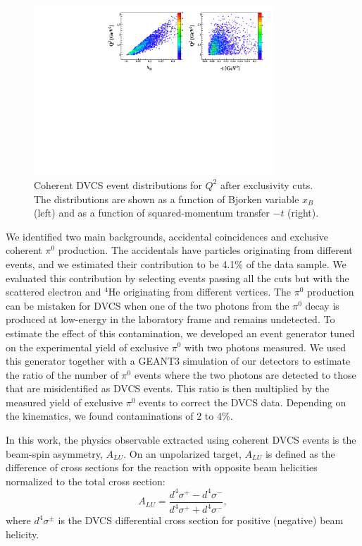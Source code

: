 \documentclass[twocolumn,nofootinbib,showpacs,prl,superscriptaddress,secnumarabic,amssymb,nobibnotes,aps,floatfix]{revtex4}
\begin{document}
\begin{figure}[tb]
\hspace{-0.45cm}
\includegraphics[width=9cm]{figs/F_Q2_xB_t_Coh.pdf}
\caption{Coherent DVCS event distributions for $Q^2$ after exclusivity cuts. 
The distributions are shown as a function of Bjorken variable $x_B$ (left) 
and as a function of squared-momentum transfer $-t$ (right).}
\label{fig:kin-coverage}
\end{figure}

We identified two main backgrounds, accidental coincidences and exclusive coherent
$\pi^0$ production. The accidentals have particles originating from different events,
and we estimated their contribution to be 4.1\% of the data sample. We evaluated this 
contribution by selecting events passing all the cuts but with the scattered electron and 
$^4$He originating from different vertices. The $\pi^0$ production can
be mistaken for DVCS when one of the two photons from the $\pi^0$ 
decay is produced at low-energy in the laboratory frame and remains undetected.  
To estimate the effect of this contamination, we developed an event generator 
tuned on the experimental yield of exclusive $\pi^0$ with two photons measured. 
We used this generator together with a GEANT3 simulation of our 
detectors to estimate the ratio of the number of $\pi^0$ events where the 
two photons are detected to those that are misidentified as DVCS events. This 
ratio is then multiplied by the measured yield of exclusive $\pi^0$ events to 
correct the DVCS data. Depending on the kinematics, we found contaminations of 
2 to 4\%. 

In this work, the physics observable extracted using coherent DVCS events is
the beam-spin asymmetry, $A_{LU}$. On an unpolarized target, $A_{LU}$ is 
defined as the difference of cross sections for the reaction with opposite beam 
helicities normalized to the total cross section:
  \begin{equation}
  A_{LU} = \frac{d^{4}\sigma^{+} - d^{4}\sigma^{-} }
                {d^{4}\sigma^{+} + d^{4}\sigma^{-}},
    \label{BSA_equation}
  \end{equation}
where $d^{4}\sigma^{\pm}$ is the DVCS differential cross 
section for positive (negative) beam helicity. 
\end{document}
